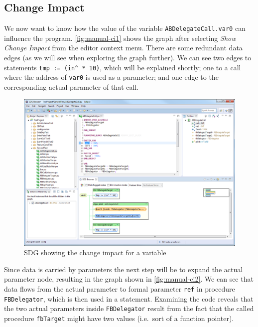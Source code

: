 \subsection*{Change Impact}

We now want to know how the value of the variable \lstinline|ABDelegateCall.var0| can influence the program. 
\autoref{fig:manual-ci1} shows the graph after selecting \emph{Show Change Impact} from the editor context menu. There 
are some redundant data edges (as we will see when exploring the graph further). We can see two edges to statements 
\lstinline|tmp := (in^ * 10)|, which will be explained shortly; one to a call where the address of \lstinline|var0| is 
used as a parameter; and one edge to the corresponding actual parameter of that call.

\begin{figure}[hpb]
  \centering
    \includegraphics[width=\textwidth]{bilder/manual-ci1}
  \caption{SDG showing the change impact for a variable}
  \label{fig:manual-ci1}
\end{figure}

Since data is carried by parameters the next step will be to expand the actual parameter node, resulting in the graph 
shown in \autoref{fig:manual-ci2}. We can see that data flows from the actual parameter to formal parameter 
\lstinline|ref| in procedure \lstinline|FBDelegator|, which is then used in a statement. Examining the code reveals 
that the two actual parameters inside \lstinline|FBDelegator| result from the fact that the called procedure 
\lstinline|fbTarget| might have two values (i.e.\ sort of a function pointer).

